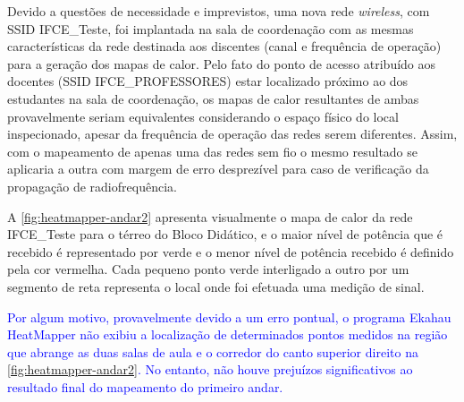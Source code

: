 Devido a questões de necessidade e imprevistos, uma nova rede \textit{wireless}, com SSID IFCE\_Teste, foi implantada na sala de coordenação com as mesmas características da rede destinada aos discentes (canal e frequência de operação) para a geração dos mapas de calor. Pelo fato do ponto de acesso atribuído aos docentes (SSID IFCE\_PROFESSORES) estar localizado próximo ao dos estudantes na sala de coordenação, os mapas de calor resultantes de ambas provavelmente seriam equivalentes considerando o espaço físico do local inspecionado, apesar da frequência de operação das redes serem diferentes. Assim,  com o mapeamento de apenas uma das redes sem fio o mesmo resultado se aplicaria a outra com margem de erro desprezível para caso de verificação da propagação de radiofrequência.

A \autoref{fig:heatmapper-andar2} apresenta visualmente o mapa de calor da rede IFCE\_Teste para o térreo do Bloco Didático, e o maior nível de potência que é recebido é representado por verde e o menor nível de potência recebido é definido pela cor vermelha. Cada pequeno ponto verde interligado a outro por um segmento de reta representa o local onde foi efetuada uma medição de sinal.

\textcolor{blue}{Por algum motivo, provavelmente devido a um erro pontual, o programa Ekahau HeatMapper não exibiu a localização de determinados pontos medidos na região que abrange as duas salas de aula e o corredor do canto superior direito na \autoref{fig:heatmapper-andar2}. No entanto, não houve prejuízos significativos ao resultado final do mapeamento do primeiro andar.}

\newpage
\begin{figure}[H]
	\centering
\end{figure}

